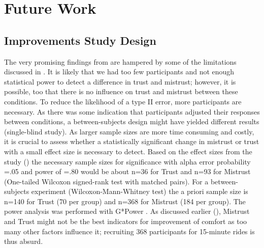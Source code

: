 \chapter{Future Work}
\label{ch:futureWork}
\section{Improvements Study Design}
\label{ImproveStudy}
The very promising findings from \emph{} are hampered by some of the limitations discussed in \emph{}. It is likely that we had too few participants and not enough statistical power to detect a difference in trust and mistrust; however, it is possible, too that there is no influence on trust and mistrust between these conditions. To reduce the likelihood of a type II error, more participants are necessary. As there was some indication that participants adjusted their responses between conditions, a between-subjects design might have yielded different results (single-blind study). 
As larger sample sizes are more time consuming and costly, it is crucial to assess whether a statistically significant change in mistrust or trust with a small effect size is necessary to detect.  Based on the effect sizes from the study (\emph{}) the necessary sample sizes for significance with alpha error probability =.05 and power of =.80 would be about n=36 for Trust and n=93 for Mistrust (One-tailed Wilcoxon signed-rank test with matched pairs). For a between-subjects experiment (Wilcoxon-Mann-Whitney test) the a priori sample size is n=140 for Trust (70 per group) and n=368 for Mistrust (184 per group). The power analysis was performed with G*Power \cite{Faul2007GPower:Sciences.}. As discussed earlier (\emph{}),  Mistrust and Trust might not be the best indicators for improvement of comfort as too many other factors influence it; recruiting 368 participants for 15-minute rides is thus absurd. 

